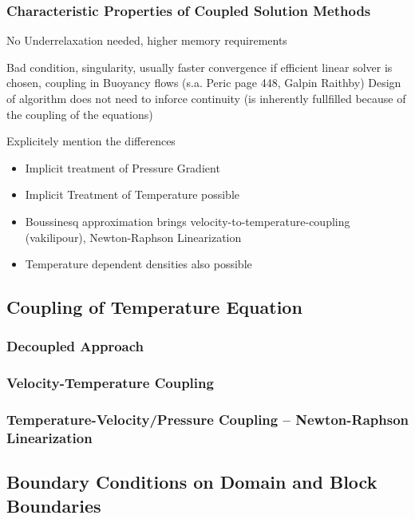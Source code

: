       \subsubsection{Characteristic Properties of Coupled Solution Methods}

        No Underrelaxation needed, higher memory requirements

        Bad condition, singularity, usually faster convergence if efficient linear solver is chosen, coupling in Buoyancy flows (s.a. Peric page 448, Galpin Raithby)
        Design of algorithm does not need to inforce continuity (is inherently fullfilled because of the coupling of the equations)

        Explicitely mention the differences

        \begin{itemize}
          \item Implicit treatment of Pressure Gradient
          \item Implicit Treatment of Temperature possible
          \item Boussinesq approximation brings velocity-to-temperature-coupling (vakilipour), Newton-Raphson Linearization
          \item Temperature dependent densities also possible
        \end{itemize}

    \subsection{Coupling of Temperature Equation}
      
      \subsubsection{Decoupled Approach}
      \subsubsection{Velocity-Temperature Coupling}
      \subsubsection{Temperature-Velocity/Pressure Coupling -- Newton-Raphson Linearization}

    \subsection{Boundary Conditions on Domain and Block Boundaries}

